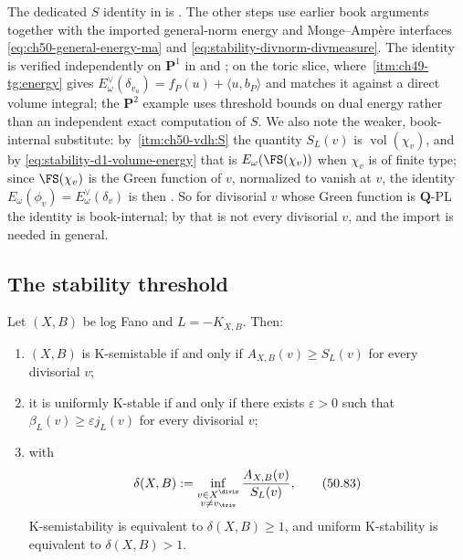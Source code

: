 \begin{remark}
\label{rem:ch50-S-import}
The dedicated $S$ identity in  is
\cite[Theorem~7.22(iii)]{BJKS1}.  The other steps use earlier book
arguments together with the imported general-norm energy and
Monge--Amp\`ere interfaces \eqref{eq:ch50-general-energy-ma} and
\eqref{eq:stability-divnorm-divmeasure}.
The identity is verified independently on
$\mathbf P^1$ in  and
; on the toric slice, where
\,\cref{itm:ch49-tg:energy} gives
$E^\vee_\omega(\delta_{v_u})=f_P(u)+\langle u,b_P\rangle$ and
 matches it against a direct volume integral; the
$\mathbf P^2$ example uses threshold bounds on dual energy rather
than an independent exact computation of $S$.  We also note the weaker,
book-internal substitute: by
\,\cref{itm:ch50-vdh:S} the quantity
$S_L(v)$ is $\operatorname{vol}(\chi_v)$, and by
\eqref{eq:stability-d1-volume-energy} that is $E_\omega(\FS(\chi_v))$ when
$\chi_v$ is of finite type; since $\FS(\chi_v)$ is the Green function
of $v$, normalized to vanish at $v$, the identity
$E_\omega(\phi_v)=E^\vee_\omega(\delta_v)$ is then
.  So for divisorial $v$ whose Green
function is $\mathbf Q$-PL the identity is book-internal; by
 that is not every divisorial $v$, and the
import is needed in general.
\end{remark}

\subsection{The stability threshold}
\label{sec:ch50-delta}

\begin{theorem}\label{thm:stability-valuative-fano}
Let $(X,B)$ be log Fano and $L=-K_{X,B}$.  Then:
\begin{enumerate}
\item $(X,B)$ is K-semistable if and only if
      $A_{X,B}(v)\geq S_L(v)$ for every divisorial $v$;
\item it is uniformly K-stable if and only if there exists
      $\varepsilon>0$ such that
      $\beta_L(v)\geq\varepsilon j_L(v)$ for every divisorial $v$;
\item with
      \[
       \delta(X,B):=
       \inf_{\substack{v\in X^{\divis}\\v\ne v_{\triv}}}
              \frac{A_{X,B}(v)}{S_L(v)},
      \tag{50.83}\label{eq:stability-delta}
      \]
      K-semistability is equivalent to $\delta(X,B)\geq1$, and uniform
      K-stability is equivalent to $\delta(X,B)>1$.
\end{enumerate}
\par
\end{theorem}

